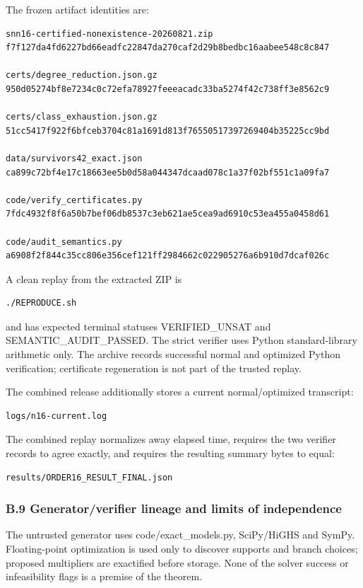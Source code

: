 \documentclass[
  english,
  11pt,
  a4paper,
]{article}
\newcounter{none} %
\begin{document}
The frozen artifact identities are:

\begin{verbatim}
snn16-certified-nonexistence-20260821.zip
f7f127da4fd6227bd66eadfc22847da270caf2d29b8bedbc16aabee548c8c847

certs/degree_reduction.json.gz
950d05274bf8e7234c0c72efa78927feeeacadc33ba5274f42c738ff3e8562c9

certs/class_exhaustion.json.gz
51cc5417f922f6bfceb3704c81a1691d813f76550517397269404b35225cc9bd

data/survivors42_exact.json
ca899c72bf4e17c18663ee5b0d58a044347dcaad078c1a37f02bf551c1a09fa7

code/verify_certificates.py
7fdc4932f8f6a50b7bef06db8537c3eb621ae5cea9ad6910c53ea455a0458d61

code/audit_semantics.py
a6908f2f844c35cc806e356cef121ff2984662c022905276a6b910d7dcaf026c
\end{verbatim}

A clean replay from the extracted ZIP is

\begin{verbatim}
./REPRODUCE.sh
\end{verbatim}

and has expected terminal statuses VERIFIED\_UNSAT and
SEMANTIC\_AUDIT\_PASSED. The strict verifier uses Python
standard-library arithmetic only. The archive records successful normal
and optimized Python verification; certificate regeneration is not part
of the trusted replay.

The combined release additionally stores a current normal/optimized
transcript:

\begin{verbatim}
logs/n16-current.log
\end{verbatim}

The combined replay normalizes away elapsed time, requires the two
verifier records to agree exactly, and requires the resulting summary
bytes to equal:

\begin{verbatim}
results/ORDER16_RESULT_FINAL.json
\end{verbatim}

\subsubsection{B.9 Generator/verifier lineage and limits of
independence}\label{b.9-generatorverifier-lineage-and-limits-of-independence}

The untrusted generator uses code/exact\_models.py, SciPy/HiGHS and
SymPy. Floating-point optimization is used only to discover supports and
branch choices; proposed multipliers are exactified before storage. None
of the solver success or infeasibility flags is a premise of the
theorem.
\end{document}
